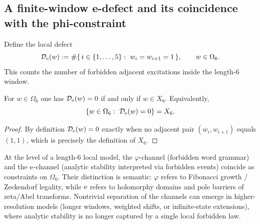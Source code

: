 \subsection{A finite-window e-defect and its coincidence with the phi-constraint}
Define the local defect
\[
\mathcal{D}_{\e}(w):=\#\{\,i\in\{1,\dots,5\}:\ w_i=w_{i+1}=1\,\},
\qquad w\in\Omega_6.
\]
This counts the number of forbidden adjacent excitations inside the length-$6$ window.

\begin{proposition}
\label{prop:e_phi_coincide}
For $w\in\Omega_6$ one has $\mathcal{D}_{\mathrm{e}}(w)=0$ if and only if $w\in X_6$.
Equivalently,
\[
\{w\in\Omega_6:\ \mathcal{D}_{\e}(w)=0\}=X_6.
\]
\end{proposition}

\begin{proof}
By definition $\mathcal{D}_{\mathrm{e}}(w)=0$ exactly when no adjacent pair $(w_i,w_{i+1})$ equals $(1,1)$, which is precisely the definition of $X_6$.
\end{proof}

\begin{remark}
At the level of a length-$6$ local model, the $\varphi$-channel (forbidden word grammar) and the $\mathrm{e}$-channel (analytic stability interpreted via forbidden events) coincide as constraints on $\Omega_6$.
Their distinction is semantic: $\varphi$ refers to Fibonacci growth / Zeckendorf legality, while $\mathrm{e}$ refers to holomorphy domains and pole barriers of zeta/Abel transforms.
Nontrivial separation of the channels can emerge in higher-resolution models (longer windows, weighted shifts, or infinite-state extensions), where analytic stability is no longer captured by a single local forbidden law.
\end{remark}


